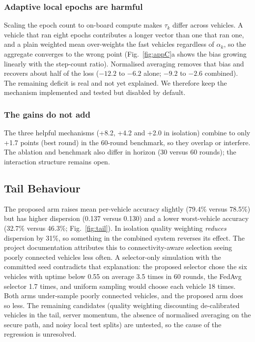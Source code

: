 \documentclass[journal]{IEEEtran}
\begin{document}
\subsubsection*{Adaptive local epochs are harmful}
Scaling the epoch count to on-board compute makes $\tau_k$ differ across vehicles. A vehicle that ran eight epochs contributes a longer vector than one that ran one, and a plain weighted mean over-weights the fast vehicles regardless of $\alpha_k$, so the aggregate converges to the wrong point (Fig.~\ref{fig:appC}a shows the bias growing linearly with the step-count ratio). Normalised averaging removes that bias and recovers about half of the loss ($-12.2$ to $-6.2$ alone; $-9.2$ to $-2.6$ combined). The remaining deficit is real and not yet explained. We therefore keep the mechanism implemented and tested but disabled by default.

\subsubsection*{The gains do not add}
The three helpful mechanisms (+8.2, +4.2 and +2.0 in isolation) combine to only +1.7 points (best round) in the 60-round benchmark, so they overlap or interfere. The ablation and benchmark also differ in horizon (30 versus 60 rounds); the interaction structure remains open.

\subsection{Tail Behaviour}\label{sec:tail}
The proposed arm raises mean per-vehicle accuracy slightly (79.4\% versus 78.5\%) but has higher dispersion (0.137 versus 0.130) and a lower worst-vehicle accuracy (32.7\% versus 46.3\%; Fig.~\ref{fig:tail}). In isolation quality weighting \emph{reduces} dispersion by 31\%, so something in the combined system reverses its effect. The project documentation attributes this to connectivity-aware selection seeing poorly connected vehicles less often. A selector-only simulation with the committed seed contradicts that explanation: the proposed selector chose the six vehicles with uptime below 0.55 on average 3.5 times in 60 rounds, the FedAvg selector 1.7 times, and uniform sampling would choose each vehicle 18 times. Both arms under-sample poorly connected vehicles, and the proposed arm does so less. The remaining candidates (quality weighting discounting de-calibrated vehicles in the tail, server momentum, the absence of normalised averaging on the secure path, and noisy local test splits) are untested, so the cause of the regression is unresolved.
\end{document}
